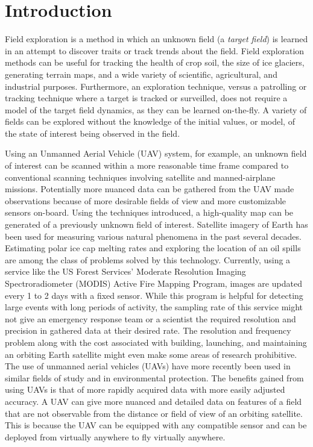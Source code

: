 
\chapter{Introduction}
Field exploration is a method in which an unknown field (a \textit{target field}) is learned in an attempt to discover traits or track trends about the field. Field exploration methods can be useful for tracking the health of crop soil, the size of ice glaciers, generating terrain maps, and a wide variety of scientific, agricultural, and industrial purposes. Furthermore, an exploration technique, versus a patrolling or tracking technique where a target is tracked or surveilled, does not require a model of the target field dynamics, as they can be learned on-the-fly. A variety of fields can be explored without the knowledge of the initial values, or model, of the state of interest being observed in the field.

Using an Unmanned Aerial Vehicle (UAV) system, for example, an unknown field of interest can be scanned within a more reasonable time frame compared to conventional scanning techniques involving satellite and manned-airplane missions. Potentially more nuanced data can be gathered from the UAV made observations because of more desirable fields of view and more customizable sensors on-board. Using the techniques introduced, a high-quality map can be generated of a previously unknown field of interest. Satellite imagery of Earth has been used for measuring various natural phenomena in the past several decades. Estimating polar ice cap melting rates and exploring the location of an oil spills are among the class of problems solved by this technology. Currently, using a service like the US Forest Services' Moderate Resolution Imaging Spectroradiometer (MODIS) Active Fire Mapping Program, images are updated every 1 to 2 days with a fixed sensor. While this program is helpful for detecting large events with long periods of activity, the sampling rate of this service might not give an emergency response team or a scientist the required resolution and precision in gathered data at their desired rate. The resolution and frequency problem along with the cost associated with building, launching, and maintaining an orbiting Earth satellite might even make some areas of research prohibitive. The use of unmanned aerial vehicles (UAVs) have more recently been used in similar fields of study and in environmental protection. The benefits gained from using UAVs is that of more rapidly acquired data with more easily adjusted accuracy. A UAV can give more nuanced and detailed data on features of a field that are not observable from the distance or field of view of an orbiting satellite. This is because the UAV can be equipped with any compatible sensor and can be deployed from virtually anywhere to fly virtually anywhere.

